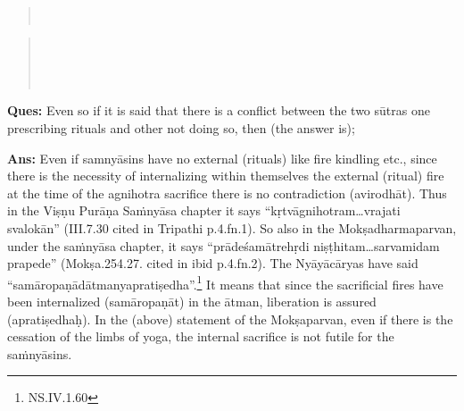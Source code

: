 \begin{verse}
\\
\end{verse}
\begin{verse}
\\
\\
\\
\end{verse}

\textbf{Ques:}  Even so if it is said that there is a conflict between the two sūtras one prescribing rituals and other not doing so, then (the answer is);

\textbf{Ans:} Even if samnyāsins have no external (rituals) like fire kindling etc., since there is the necessity of internalizing within themselves the external (ritual) fire at the time of the agnihotra sacrifice there is no contradiction (avirodhāt). Thus in the Viṣṇu Purāṇa Saṁnyāsa chapter it says “kṛtvāgnihotram…vrajati svalokān” (III.7.30 cited in Tripathi p.4.fn.1). So also in the Mokṣadharmaparvan, under the saṁnyāsa chapter, it says “prādeśamātrehṛdi niṣṭhitam…sarvamidam prapede”   (Mokṣa.254.27. cited in ibid p.4.fn.2). The Nyāyācāryas have said “samāropaṇādātmanyapratiṣedha”.\footnote{NS.IV.1.60} It means that since the sacrificial fires have been internalized (samāropaṇāt) in the ātman, liberation is assured (apratiṣedhaḥ). In the (above) statement of the Mokṣaparvan, even if there is the cessation of the limbs of yoga, the internal sacrifice is not futile for the saṁnyāsins.

